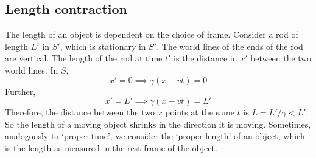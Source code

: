 \subsection{Length contraction}
The length of an object is dependent on the choice of frame.
Consider a rod of length \(L'\) in \(S'\), which is stationary in \(S'\).
The world lines of the ends of the rod are vertical.
The length of the rod at time \(t'\) is the distance in \(x'\) between the two world lines.
In \(S\),
\[
	x' = 0 \implies \gamma(x - vt) = 0
\]
Further,
\[
	x' = L' \implies \gamma(x - vt) = L'
\]
Therefore, the distance between the two \(x\) points at the same \(t\) is \(L = L'/\gamma < L'\).
So the length of a moving object shrinks in the direction it is moving.
Sometimes, analogously to `proper time', we consider the `proper length' of an object, which is the length as measured in the rest frame of the object.

